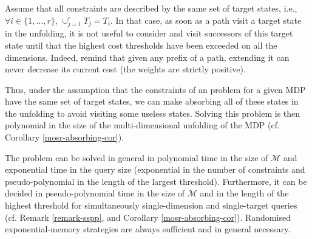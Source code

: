 \begin{remark} \label{remark-sspp}
  Assume that all constraints are described by the same set of target states, i.e., $\forall i \in \{1, \dots, r\}$, $\cup_{j=1}^r T_j = T_i$.
  In that case, as soon as a path visit a target state in the unfolding, it is not useful to consider and visit successors of this target state until that the highest cost thresholds have been exceeded on all the dimensions.
  Indeed, remind that given any prefix of a path, extending it can never decrease its current cost %
  (the weights are strictly positive).\par
  Thus, under the assumption that the constraints of an \SSPPQ{} problem for a given MDP have the same set of target states, we can make absorbing all of these states in the unfolding to avoid visiting some useless states.
  Solving this \SSPPQ{} problem is then polynomial in the size of the multi-dimensional unfolding of the MDP (cf. Corollary \ref{mosr-absorbing-cor}).
\end{remark}

\begin{theorem}
  The \SSPPQ{} problem
  can be solved in general in polynomial time in the size of $\mathcal{M}$ and exponential time in the query size (exponential in the number of constraints and pseudo-polynomial in the length of the largest threshold). Furthermore, it
  can be decided in pseudo-polynomial time in the size of $\mathcal{M}$ and in the length of the highest threshold for simultaneously single-dimension and single-target queries (cf. Remark \ref{remark-sspp}, and Corollary \ref{mosr-absorbing-cor}).
  Randomised exponential-memory strategies are always sufficient and in general necessary.
\end{theorem}

